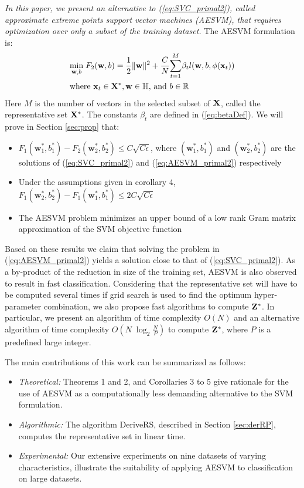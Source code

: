 \documentclass[twoside]{article}
\begin{document}
{\em In this paper, we present an alternative to (\ref{eq:SVC_primal2}), called approximate extreme points support vector machines (AESVM), that requires optimization over only a subset of the training dataset.} The AESVM formulation is:
\begin{align}
&\underset{\mathbf{w},b}{\mathit{\min}}\;{F}_2(\mathbf{w} ,b) = \frac{1}{2}\|{\mathbf{w}}\|^2 + \frac{C}{N}\overset{M}{\underset{t = 1}\sum}\beta_t l(\mathbf{w},b,\phi({\bf x}_t))  \label{eq:AESVM_primal2}\\
&\text{where } {\bf x}_t \in {\bf X}^*,{\bf w} \in \mathbb{H}\text{, and } b \in \mathbb{R} \nonumber
\end{align}
Here  $M$ is the number of vectors in the selected subset of ${\bf X}$, called the representative set ${\bf X}^*$. The constants $\beta _t$ are defined in (\ref{eq:betaDef}). We will prove in Section \ref{sec:prop} that:

\begin{itemize}
\item ${F}_1 (\mathbf{w}_1 ^*, b_1 ^*) - {F}_2 (\mathbf{w}_2 ^*, b_2 ^*) \le C\sqrt{C\epsilon}$, where $(\mathbf{w}_1 ^*, b_1 ^*)$ and $(\mathbf{w}_2 ^*, b_2 ^*)$ are the solutions of (\ref{eq:SVC_primal2}) and (\ref{eq:AESVM_primal2}) respectively
\item Under the assumptions given in corollary 4, ${F}_1 (\mathbf{w}_2 ^*, b_2 ^*) - {F}_1 (\mathbf{w}_1 ^*, b_1 ^*) \le 2C\sqrt{C\epsilon}$
\item The AESVM problem minimizes an upper bound of a low rank Gram matrix approximation of the SVM objective function
\end{itemize}

Based on these results we claim that solving the problem in (\ref{eq:AESVM_primal2}) yields a solution close to that of (\ref{eq:SVC_primal2}). As a by-product of the reduction in size of the training set, AESVM is also observed to result in fast classification. Considering that the representative set will have to be computed several times if grid search is used to find the optimum hyper-parameter combination, we also propose fast algorithms to compute ${\bf Z}^*$. In particular, we present an algorithm of time complexity $O(N)$ and an alternative algorithm of time complexity $O(N\; \log_2 \frac{N}{P})$ to compute ${\bf Z}^*$, where $P$ is a predefined large integer.

The main contributions of this work can be summarized as follows:
\begin{itemize}
\item {\it Theoretical:} Theorems 1 and 2, and Corollaries 3 to 5 give rationale for the use of AESVM as a computationally less demanding alternative to the SVM formulation.
\item {\it Algorithmic:} The algorithm DeriveRS, described in Section \ref{sec:derRP}, computes the representative set in linear time.
\item {\it Experimental:} Our extensive experiments on nine datasets of varying characteristics, illustrate the suitability of applying AESVM to classification on large datasets.
\end{itemize}
\end{document}
